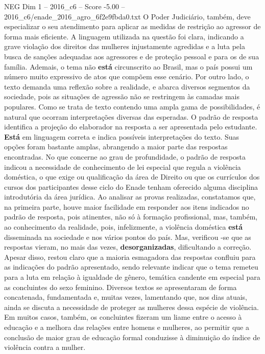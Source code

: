 \begin{textsample}{NEG Dim 1 – 2016\_c6 – Score -5.00 – 2016\_c6/enade\_2016\_agro\_6f2e9fbda0.txt}
O Poder Judiciário, também, deve especializar o seu atendimento para aplicar as medidas de restrição ao agressor de forma mais eficiente.
A linguagem utilizada na questão foi clara, indicando a grave violação dos direitos das mulheres injustamente agredidas e a luta pela busca de sanções adequadas aos agressores e de proteção pessoal e para os de sua família.
Ademais, o tema não \textbf{está} circunscrito ao Brasil, mas o país possui um número muito expressivo de atos que compõem esse cenário.
Por outro lado, o texto demanda uma reflexão sobre a realidade, e abarca diversos segmentos da sociedade, pois as situações de agressão não se restringem às camadas mais populares.
Como se trata de texto contendo uma ampla gama de possibilidades, é natural que ocorram interpretações diversas das esperadas.
O padrão de resposta identifica a projeção do elaborador na resposta a ser apresentada pelo estudante. \textbf{Está} em linguagem correta e indica possíveis interpretações do texto.
Suas opções foram bastante amplas, abrangendo a maior parte das respostas encontradas.
No que concerne ao grau de profundidade, o padrão de resposta indicou a necessidade de conhecimento de lei especial que regula a violência doméstica, o que exige ou qualificação da área de Direito ou que os currículos dos cursos dos participantes desse ciclo do Enade tenham oferecido alguma disciplina introdutória da área jurídica.
Ao analisar as provas realizadas, constatamos que, na primeira parte, houve maior facilidade em responder aos itens indicados no padrão de resposta, pois atinentes, não só à formação profissional, mas, também, ao conhecimento da realidade, pois, infelizmente, a violência doméstica \textbf{está} disseminada na sociedade e nos vários pontos do país.
Mas, verificou -se que as respostas vieram, no mais das vezes, \textbf{desorganizadas}, dificultando a correção.
Apesar disso, restou claro que a maioria esmagadora das respostas confluiu para as indicações do padrão apresentado, sendo relevante indicar que o tema remeteu para a luta em relação à igualdade de gênero, temática candente em especial para as concluintes do sexo feminino.
Diversos textos se apresentaram de forma concatenada, fundamentada e, muitas vezes, lamentando que, nos dias atuais, ainda se discuta a necessidade de proteger as mulheres dessa espécie de violência.
Em muitos casos, também, os concluintes fizeram um liame entre o acesso à educação e a melhora das relações entre homens e mulheres, ao permitir que a conclusão de maior grau de educação formal conduzisse à diminuição do índice de violência contra a mulher.

\end{textsample}
